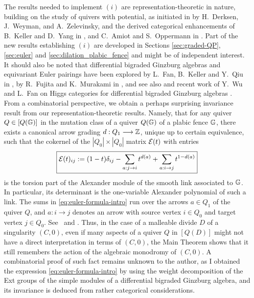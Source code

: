 The results needed to implement $(i)$ are representation-theoretic in nature, building on the study of quivers with potential, as initiated in \cite{DWZ} by H.~Derksen, J.~Weyman, and A.~Zelevinsky, and the derived categorical enhancements of B.~Keller and D.~Yang in \cite{KellerYang}, and C.~Amiot and S.~Oppermann in \cite{AO}. Part of the new results establishing $(i)$ are developed in Sections \ref{sec:graded-QP}, \ref{sec:euler} and \ref{sec:dilation_plabic_fence} and might be of independent interest. It should also be noted that differential bigraded Ginzburg algebras and equivariant Euler pairings have been explored by L.~Fan, B.~Keller and Y.~Qiu in \cite{FanKellerQiu2024}, by R.~Fujita and K.~Murakami in \cite{FujitaMurakami2022}, and see also \cite{Keller2020Cartan} and recent work of Y.~Wu and L.~Fan on Higgs categories for differential bigraded Ginzburg algebras \cite{Wu2026Graded}.\\

From a combinatorial perspective, we obtain a perhaps surprising invariance result from our representation-theoretic results. Namely, that for any quiver $Q\in[Q(\mathbb G)]$ in the mutation class of a quiver $Q(\mathbb G)$ of a plabic fence $\mathbb G$, there exists a canonical arrow grading $d:Q_1\longrightarrow\mathbb Z$, unique up to certain equivalence, such that the cokernel of the $|Q_0|\times|Q_0|$ matrix $\mathcal E(t)$ with entries
\begin{equation}\label{eq:euler-formula-intro}
 \boxed{
 \mathcal E(t)_{ij}
 :=(1-t)\delta_{ij}
 -\sum_{a:j\to i}t^{d(a)}
 +\sum_{a:i\to j}t^{1-d(a)}}
\end{equation}
is the torsion part of the Alexander module of the smooth link associated to $\mathbb G$. In particular, its determinant is the one-variable Alexander polynomial of such a link. The sums in \eqref{eq:euler-formula-intro} run over the arrows $a\in Q_1$ of the quiver $Q$, and $a:i\to j$ denotes an arrow with source vertex $i\in Q_0$ and target vertex $j\in Q_0$. See~ and . Thus, in the case of a malleable divide $D$ of a singularity $(C,0)$, even if many aspects of a quiver $Q$ in $[Q(D)]$ might not have a direct interpretation in terms of $(C,0)$, the Main Theorem shows that it still remembers the action of the algebraic monodromy of $(C,0)$. A combinatorial proof of such fact remains unknown to the author, as I obtained the expression \eqref{eq:euler-formula-intro} by using the weight decomposition of the Ext groups of the simple modules of a differential bigraded Ginzburg algebra, and its invariance is deduced from rather categorical considerations.\\

